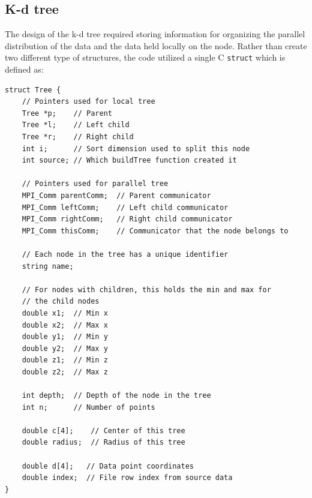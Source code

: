 \documentclass{article}
\begin{document}




%
%

\subsection{K-d tree}
%
%

The design of the k-d tree required storing information for organizing the parallel distribution of the data and the data held locally on the node. Rather than create two different type of structures, the code utilized a single C \texttt{struct} which is defined as:

\lstset{language=C++, keepspaces=true}
\begin{lstlisting}
struct Tree {
    // Pointers used for local tree
	Tree *p;    // Parent
	Tree *l;    // Left child
	Tree *r;    // Right child
	int i;      // Sort dimension used to split this node
	int source; // Which buildTree function created it

    // Pointers used for parallel tree
	MPI_Comm parentComm;  // Parent communicator
	MPI_Comm leftComm;    // Left child communicator
	MPI_Comm rightComm;   // Right child communicator
	MPI_Comm thisComm;    // Communicator that the node belongs to

    // Each node in the tree has a unique identifier
	string name;

    // For nodes with children, this holds the min and max for
    // the child nodes
	double x1;  // Min x
	double x2;  // Max x
	double y1;  // Min y
	double y2;  // Max y
	double z1;  // Min z
	double z2;  // Max z

	int depth;  // Depth of the node in the tree
	int n;      // Number of points

	double c[4];    // Center of this tree
	double radius;  // Radius of this tree

	double d[4];   // Data point coordinates
	double index;  // File row index from source data
}
\end{lstlisting}

%
%
\end{document}
